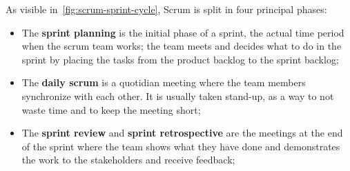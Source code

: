 As visible in~\cref{fig:scrum-sprint-cycle}, Scrum is split in four principal phases:
\begin{itemize}
  \item The \textbf{sprint planning} is the initial phase of a sprint, the actual time period when the scrum team works; the team meets and decides what to do in the sprint by placing the tasks from the product backlog to the sprint backlog;
  \item The \textbf{daily scrum} is a quotidian meeting where the team members synchronize with each other. It is usually taken stand-up, as a way to not waste time and to keep the meeting short;
  \item The \textbf{sprint review} and \textbf{sprint retrospective} are the meetings at the end of the sprint where the team shows what they have done and demonstrates the work to the stakeholders and receive feedback;
\end{itemize}
